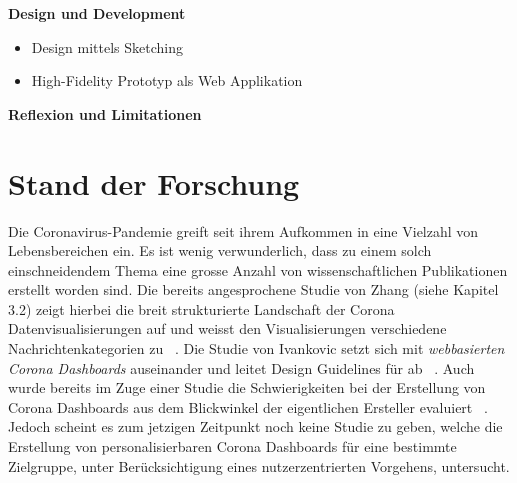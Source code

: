 \documentclass[12pt, oneside]{article}
\begin{document}
\textbf{Design und Development}
\begin{itemize}
    \item Design mittels Sketching
    \item High-Fidelity Prototyp als Web Applikation\\
\end{itemize}

\textbf{Reflexion und Limitationen}

\clearpage
\section{Stand der Forschung}
Die Coronavirus-Pandemie greift seit ihrem Aufkommen in eine Vielzahl von Lebensbereichen ein. Es ist wenig verwunderlich, dass zu einem solch einschneidendem Thema eine grosse Anzahl von wissenschaftlichen Publikationen erstellt worden sind. Die bereits angesprochene Studie von Zhang (siehe Kapitel 3.2) zeigt hierbei die breit strukturierte Landschaft der Corona Datenvisualisierungen auf und weisst den Visualisierungen verschiedene Nachrichtenkategorien zu ~\citep{YixuanZhang.}. Die Studie von Ivankovic setzt sich mit \textit{webbasierten Corona Dashboards} auseinander und leitet Design Guidelines für ab ~\citep{Ivankovic.2021}. Auch wurde bereits im Zuge einer Studie die Schwierigkeiten bei der Erstellung von Corona Dashboards aus dem Blickwinkel der eigentlichen Ersteller evaluiert ~\citep{Barbazza.2021}. Jedoch scheint es zum jetzigen Zeitpunkt noch keine Studie zu geben, welche die Erstellung von personalisierbaren Corona Dashboards für eine bestimmte Zielgruppe, unter Berücksichtigung eines nutzerzentrierten Vorgehens, untersucht.

\clearpage



\clearpage
\end{document}
